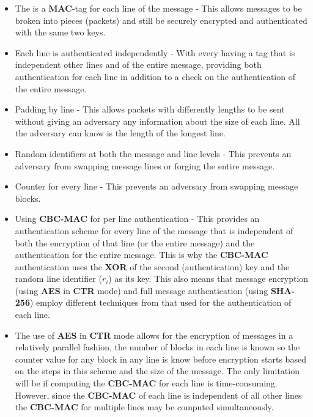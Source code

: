 \documentclass[../midterm.tex]{subfiles}
\begin{document}
\begin{flushleft}
\begin{itemize}
	\item The is a \textbf{MAC}-tag for each line of the message - This allows messages to be broken into pieces (packets) and still be securely encrypted and authenticated with the same two keys.  
	\item Each line is authenticated independently - With every having a tag that is independent other lines and of the entire message, providing both authentication for each line in addition to a check on the authentication of the entire message.
	\item Padding by line - This allows packets with differently lengths to be sent without giving an adversary any information about the size of each line.  All the adversary can know is the length of the longest line.
	\item Random identifiers at both the message and line levels - This prevents an adversary from swapping message lines or forging the entire message.
	\item Counter for every line - This prevents an adversary from swapping message blocks.
	\item Using \textbf{CBC-MAC} for per line authentication - This provides an authentication scheme for every line of the message that is independent of both the encryption of that line (or the entire message) and the authentication for the entire message.  This is why the \textbf{CBC-MAC} authentication uses the \textbf{XOR} of the second (authentication) key and the random line identifier ($r_i$) as its key.  This also means that message encryption (using \textbf{AES} in \textbf{CTR} mode) and full message authentication (using \textbf{SHA-256}) employ different techniques from that used for the authentication of each line. 
	\item The use of \textbf{AES} in \textbf{CTR} mode allows for the encryption of messages in a relatively parallel fashion, the number of blocks in each line is known so the counter value for any block in any line is know before encryption starts based on the steps in this scheme and the size of the message.  The only limitation will be if computing the \textbf{CBC-MAC} for each line is time-consuming.  However, since the \textbf{CBC-MAC} of each line is independent of all other lines the \textbf{CBC-MAC} for multiple lines may be computed simultaneously.

\end{itemize}
\end{flushleft}
\end{document}
